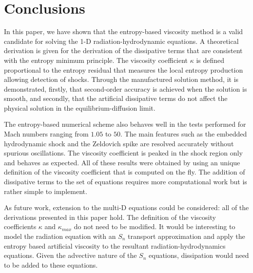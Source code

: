\documentclass[review]{elsarticle}
\begin{document}
\section{Conclusions}
\label{sec:ccl}

In this paper, we have shown that the entropy-based viscosity method is a valid candidate for solving the 1-D radiation-hydrodynamic equations. A theoretical derivation is given for the derivation of the dissipative terms that are consistent with the entropy minimum principle. The viscosity coefficient $\kappa$ is defined proportional to the entropy residual that measures the local entropy production allowing detection of shocks. Through the manufactured solution method, it is demonstrated, firstly, that second-order accuracy is achieved when the solution is smooth, and secondly, that the artificial dissipative terms do not affect the physical solution in the equilibrium-diffusion limit. 

The entropy-based numerical scheme also behaves well in the tests performed for Mach numbers ranging from $1.05$ to $50$. The main features such as the embedded hydrodynamic shock and the Zeldovich spike are resolved accurately without spurious oscillations. The viscosity coefficient is peaked in the shock region only and behaves as expected. All of these results were obtained by using an unique definition of the viscosity coefficient that is computed on the fly. The addition of dissipative terms to the set of equations requires more computational work but is rather simple to implement.

As future work, extension to the multi-D equations could be considered: all of the derivations presented in this paper hold. The definition of the viscosity coefficients $\kappa$ and $\kappa_{max}$ do not need to be modified. It would be interesting to model the radiation equation with an $S_n$ transport approximation and apply the entropy based artificial viscosity to the resultant radiation-hydrodynamics equations. Given the advective nature of the $S_n$ equations, dissipation would need to be added to these equations.

\end{document}
